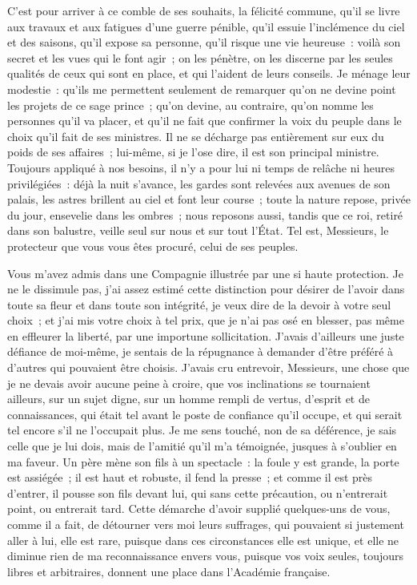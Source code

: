\documentclass[french,twoside]{book} %
\begin{document}
C'est pour arriver à ce comble de ses souhaits, la félicité commune, qu’il se livre aux travaux et aux fatigues d’une guerre pénible, qu’il essuie l’inclémence du ciel et des saisons, qu’il expose sa personne, qu’il risque une vie heureuse : voilà son secret et les vues qui le font agir ; on les pénètre, on les discerne par les seules qualités de ceux qui sont en place, et qui l’aident de leurs conseils. Je ménage leur modestie : qu’ils me permettent seulement de remarquer qu’on ne devine point les projets de ce sage prince ; qu’on devine, au contraire, qu’on nomme les personnes qu’il va placer, et qu’il ne fait que confirmer la voix du peuple dans le choix qu’il fait de ses ministres. Il ne se décharge pas entièrement sur eux du poids de ses affaires ; lui-même, si je l’ose dire, il est son principal ministre. Toujours appliqué à nos besoins, il n’y a pour lui ni temps de relâche ni heures privilégiées : déjà la nuit s’avance, les gardes sont relevées aux avenues de son palais, les astres brillent au ciel et font leur course ; toute la nature repose, privée du jour, ensevelie dans les ombres ; nous reposons aussi, tandis que ce roi, retiré dans son balustre, veille seul sur nous et sur tout l’État. Tel est, Messieurs, le protecteur que vous vous êtes procuré, celui de ses peuples.\par
Vous m’avez admis dans une Compagnie illustrée par une si haute protection. Je ne le dissimule pas, j’ai assez estimé cette distinction pour désirer de l’avoir dans toute sa fleur et dans toute son intégrité, je veux dire de la devoir à votre seul choix ; et j’ai mis votre choix à tel prix, que je n’ai pas osé en blesser, pas même en effleurer la liberté, par une importune sollicitation. J'avais d’ailleurs une juste défiance de moi-même, je sentais de la répugnance à demander d’être préféré à d’autres qui pouvaient être choisis. J'avais cru entrevoir, Messieurs, une chose que je ne devais avoir aucune peine à croire, que vos inclinations se tournaient ailleurs, sur un sujet digne, sur un homme rempli de vertus, d’esprit et de connaissances, qui était tel avant le poste de confiance qu’il occupe, et qui serait tel encore s’il ne l’occupait plus. Je me sens touché, non de sa déférence, je sais celle que je lui dois, mais de l’amitié qu’il m’a témoignée, jusques à s’oublier en ma faveur. Un père mène son fils à un spectacle : la foule y est grande, la porte est assiégée ; il est haut et robuste, il fend la presse ; et comme il est près d’entrer, il pousse son fils devant lui, qui sans cette précaution, ou n’entrerait point, ou entrerait tard. Cette démarche d’avoir supplié quelques-uns de vous, comme il a fait, de détourner vers moi leurs suffrages, qui pouvaient si justement aller à lui, elle est rare, puisque dans ces circonstances elle est unique, et elle ne diminue rien de ma reconnaissance envers vous, puisque vos voix seules, toujours libres et arbitraires, donnent une place dans l’Académie française.\par
\end{document}
